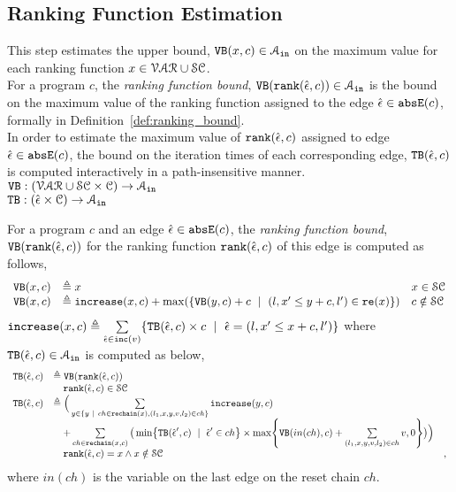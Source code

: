   \subsection{Ranking Function Estimation}
  This step estimates the upper bound, ${\mathtt{VB}}(x, c) \in \mathcal{A}_{\mathtt{in}}$
  on the maximum value for each ranking function   $x \in  \mathcal{VAR} \cup \mathcal{SC}$.
  \\
  For a program $c$, the \emph{ranking function bound},
  ${\mathtt{VB}}(\mathtt{rank}(\hat{\mathtt{\epsilon}{}}, c)) \in \mathcal{A}_{\mathtt{in}}$ is 
  the bound on the maximum value of the ranking function  
  assigned to the edge $\hat{\mathtt{\epsilon}{}} \in \mathtt{abs}{\mathtt{E}}(c)$, formally in Definition~\ref{def:ranking_bound}.
  \\
  In order to estimate the maximum value of $\mathtt{rank}(\hat{\mathtt{\epsilon}{}}, c)$ assigned to edge $\hat{\mathtt{\epsilon}{}} \in \mathtt{abs}{\mathtt{E}}(c)$,
  the bound on the iteration times of each corresponding edge, ${\mathtt{TB}}(\hat{\mathtt{\epsilon}{}}, c)$ 
  is computed interactively in a path-insensitive manner.
  \\ 
  $ {\mathtt{VB}}: (\mathcal{VAR} \cup \mathcal{SC}  \times \mathcal{C}) \to \mathcal{A}_{\mathtt{in}}$
  \\
  ${\mathtt{TB}}: (\hat{\mathtt{\epsilon}{}} \times \mathcal{C}) \to \mathcal{A}_{\mathtt{in}}$
  \begin{defn}
    \label{def:ranking_bound}
  For a program $c$ and an edge $\hat{\mathtt{\epsilon}{}} \in \mathtt{abs}{\mathtt{E}}(c)$,
  the \emph{ranking function bound}, ${\mathtt{VB}}(\mathtt{rank}(\hat{\mathtt{\epsilon}{}}, c))$ for the ranking function $\mathtt{rank}(\hat{\mathtt{\epsilon}{}}, c)$
  of this edge
  is computed as follows,
    \[ 
  \begin{array}{lll}
    {\ensuremath{\mathtt{VB}}}(x, c) & \triangleq x & x \in \mathcal{SC} \\
    {\mathtt{VB}}(x, c) & \triangleq \mathtt{increase}(x, c) + \max(\{{\mathtt{VB}}(y, c) + c ~\mid~ (l, x' \leq y + c, l') \in \mathtt{re}(x)\}) & c \notin \mathcal{SC}
  \end{array}
  \]
  $\mathtt{increase}(x, c) \triangleq \sum\limits_{\hat{\mathtt{\epsilon}{}} \in \mathtt{inc}(v)}\{{\mathtt{TB}}(\hat{\mathtt{\epsilon}{}}, c) \times c ~\mid~ \hat{\mathtt{\epsilon}{}} = (l, x' \leq x + c, l')\}$ where 
  ${\mathtt{TB}}(\hat{\mathtt{\epsilon}{}}, c) \in \mathcal{A}_{\mathtt{in}}$  is computed as below,
\[ 
\begin{array}{lll}
  \absclr(\absevent, c) 
  & \triangleq \varinvar(\locbound(\absevent, c))  & \\
  & \quad \locbound(\absevent, c) \in \constdom & \\
  \absclr(\absevent, c) 
  & \triangleq \Big(
    \sum\limits_{y \in \{ y ~|~ 
    ch \in \resetchain(x), (l_1, x, y, v, l_2) \in ch \} } \incrs(y, c) & \\
    & \quad + 
  \sum\limits_{ch \in \resetchain(x, c)}
  \big( \min\left\{\absclr(\absevent', c) ~\mid~ \absevent' \in ch\right\} \times 
  \max\left\{\varinvar(in(ch), c) + \sum\limits_{(l_1, x, y, v, l_2) \in ch } v, 0 \right\}\big) \Big)  & \\
  &  \quad \locbound(\absevent, c) = x \land x \notin \constdom & ,
\end{array}
  \]
 where $in(ch)$ is the variable on the last edge on the reset chain $ch$.
\end{defn}
